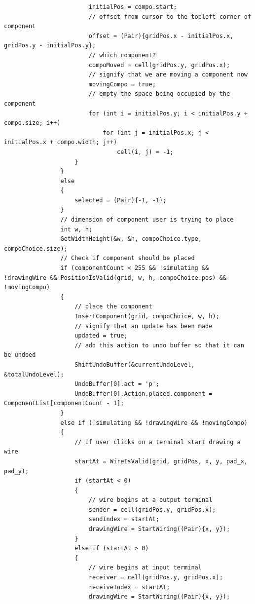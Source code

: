 \documentclass[report]{subfiles}
\begin{document}
\begin{lstlisting}
                        initialPos = compo.start;
                        // offset from cursor to the topleft corner of component
                        offset = (Pair){gridPos.x - initialPos.x, gridPos.y - initialPos.y};
                        // which component?
                        compoMoved = cell(gridPos.y, gridPos.x);
                        // signify that we are moving a component now
                        movingCompo = true;
                        // empty the space being occupied by the component
                        for (int i = initialPos.y; i < initialPos.y + compo.size; i++)
                            for (int j = initialPos.x; j < initialPos.x + compo.width; j++)
                                cell(i, j) = -1;
                    }
                }
                else
                {
                    selected = (Pair){-1, -1};
                }
                // dimension of component user is trying to place
                int w, h;
                GetWidthHeight(&w, &h, compoChoice.type, compoChoice.size);
                // Check if component should be placed
                if (componentCount < 255 && !simulating && !drawingWire && PositionIsValid(grid, w, h, compoChoice.pos) && !movingCompo)
                {
                    // place the component
                    InsertComponent(grid, compoChoice, w, h);
                    // signify that an update has been made
                    updated = true;
                    // add this action to undo buffer so that it can be undoed
                    ShiftUndoBuffer(&currentUndoLevel, &totalUndoLevel);
                    UndoBuffer[0].act = 'p';
                    UndoBuffer[0].Action.placed.component = ComponentList[componentCount - 1];
                }
                else if (!simulating && !drawingWire && !movingCompo)
                {
                    // If user clicks on a terminal start drawing a wire
                    startAt = WireIsValid(grid, gridPos, x, y, pad_x, pad_y);
                    if (startAt < 0)
                    {
                        // wire begins at a output terminal
                        sender = cell(gridPos.y, gridPos.x);
                        sendIndex = startAt;
                        drawingWire = StartWiring((Pair){x, y});
                    }
                    else if (startAt > 0)
                    {
                        // wire begins at input terminal
                        receiver = cell(gridPos.y, gridPos.x);
                        receiveIndex = startAt;
                        drawingWire = StartWiring((Pair){x, y});

\end{lstlisting}
\end{document}

